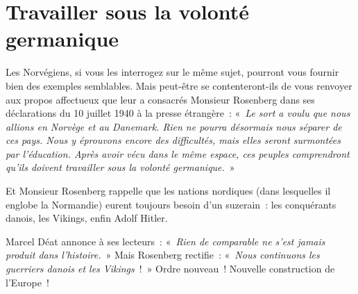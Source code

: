 \documentclass[french,twoside]{book} %
\begin{document}
\section[{Travailler sous la volonté germanique}]{Travailler sous la volonté germanique}
\noindent Les Norvégiens, si vous les interrogez sur le même sujet, pourront vous fournir bien des exemples semblables. Mais peut-être se contenteront-ils de vous renvoyer aux propos affectueux que leur a consacrés Monsieur Rosenberg dans ses déclarations du 10 juillet 1940 à la presse étrangère : « \emph{Le sort a voulu que nous allions en Norvège et au Danemark. Rien ne pourra désormais nous séparer de ces pays. Nous y éprouvons encore des difficultés, mais elles seront surmontées par l’éducation. Après avoir vécu dans le même espace, ces peuples comprendront qu’ils doivent travailler sous la volonté germanique.} »\par
Et Monsieur Rosenberg rappelle que les nations nordiques (dans lesquelles il englobe la Normandie) eurent toujours besoin d’un suzerain : les conquérants danois, les Vikings, enfin Adolf Hitler.\par
Marcel Déat annonce à ses lecteurs : « \emph{Rien de comparable ne s’est jamais produit dans l’histoire.} » Mais Rosenberg rectifie : « \emph{Nous continuons les guerriers danois et les Vikings} ! » Ordre nouveau ! Nouvelle construction de l’Europe !
\end{document}
